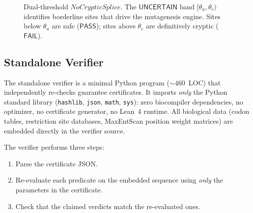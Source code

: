 \documentclass[sigplan,10pt,manuscript,review,anonymous]{acmart}
\newcommand{\PASS}{\ensuremath{\mathsf{PASS}}\xspace}
\newcommand{\FAIL}{\ensuremath{\mathsf{FAIL}}\xspace}
\newcommand{\UNCERTAIN}{\ensuremath{\mathsf{UNCERTAIN}}\xspace}
\begin{document}
\begin{figure}[t]
\centering
{}
\caption{Dual-threshold $\mathit{NoCrypticSplice}$.
         The \UNCERTAIN{} band $[\theta_u, \theta_c)$ identifies
         borderline sites that drive the mutagenesis engine.
         Sites below $\theta_u$ are safe (\PASS); sites above
         $\theta_c$ are definitively cryptic (\FAIL).}
\label{fig:dualthresh}
\end{figure}

\subsection{Standalone Verifier}\label{sec:verifier}

The standalone verifier is a minimal Python program (${\sim}460$~LOC)
that independently re-checks guarantee certificates.
It imports \emph{only} the Python standard library
(\texttt{hashlib}, \texttt{json}, \texttt{math}, \texttt{sys}):
zero biocompiler dependencies, no optimizer, no certificate generator,
no Lean~4 runtime.
All biological data (codon tables, restriction site databases,
MaxEntScan position weight matrices) are embedded directly in the
verifier source.

The verifier performs three steps:
\begin{enumerate}[leftmargin=*,itemsep=0pt,topsep=1pt]
\item Parse the certificate JSON.
\item Re-evaluate each predicate on the embedded sequence using
      \emph{only} the parameters in the certificate.
\item Check that the claimed verdicts match the re-evaluated ones.
\end{enumerate}
\end{document}
